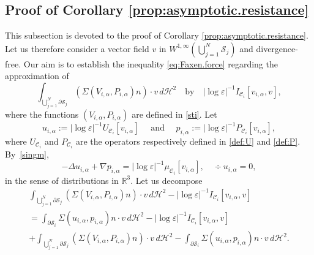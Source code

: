 \documentclass[10pt]{amsart}
\newcommand{\R}{\mathbb{R}}
\let\eps\varepsilon
\theoremstyle{definition}
\theoremstyle{remark}
\let\oldbigcup\bigcup
\begin{document}
\subsection{Proof of Corollary \ref{prop:asymptotic.resistance}}
\label{sec-prop:asymptotic.resistance}
This subsection is devoted to the proof of Corollary \ref{prop:asymptotic.resistance}.
Let us therefore consider a vector field $v $ in $W^{1,\infty}(\bigcup_{j=1}^N \mathcal S_j)$ and divergence-free.
Our aim is to establish the inequality \eqref{eq:Faxen.force}
regarding the approximation of
\begin{equation}
\int_{\oldbigcup_{j=1}^N \partial \mathcal S_j} (\Sigma (V_{i,\alpha}, P_{i,\alpha}) n) \cdot v \, d\mathcal{H}^2 \quad \text{by} \quad
\left|\log \eps\right|^{-1}
I_{\mathcal{C}_i } [v_{i,\alpha}, v], \end{equation}
where the functions $(V_{i,\alpha},P_{i,\alpha})$ are defined in \eqref{sti}.
Let
\begin{equation}
u_{i,\alpha} := \left|\log \eps\right|^{-1} U_{\mathcal C_i}[v_{i,\alpha}] \quad \text{ and } \quad
p_{i,\alpha} := \left|\log \eps\right|^{-1} P_{\mathcal C_i}[v_{i,\alpha}],
\end{equation}
where $U_{\mathcal C_i}$ and $P_{\mathcal C_i}$ are the operators respectively defined in \eqref{def:U} and \eqref{def:P}. By~\eqref{singm},
\begin{equation}
\label{dela}
-\Delta u_{i,\alpha} + \nabla p_{i,\alpha} = \left|\log \eps\right|^{-1} \mu_{\mathcal C_i}[v_{i,\alpha}], \quad \div u_{i,\alpha} = 0,
\end{equation}
in the sense of distributions in $\R^3$.
Let us decompose
\begin{multline}
\label{decompos}
\int_{\oldbigcup_{j=1}^N \partial \mathcal S_j} (\Sigma (V_{i,\alpha}, P_{i,\alpha}) n) \cdot v \, d\mathcal{H}^2 - \left|\log \eps\right|^{-1}
I_{\mathcal{C}_i } [v_{i,\alpha}, v]
\\
= \int_{\partial \mathcal S_{i}} \Sigma(u_{i,\alpha},p_{i,\alpha}) n \cdot v \, d\mathcal{H}^2
- \left|\log \eps\right|^{-1} I_{\mathcal{C}_i } [v_{i,\alpha},v]
\\ + \int_{\oldbigcup_{j=1}^N \partial \mathcal S_j} (\Sigma (V_{i,\alpha}, P_{i,\alpha}) n) \cdot v \, d\mathcal{H}^2 - \int_{\partial \mathcal S_{i}} \Sigma(u_{i,\alpha},p_{i,\alpha}) n \cdot v \, d\mathcal{H}^2.
\end{multline}
\end{document}
